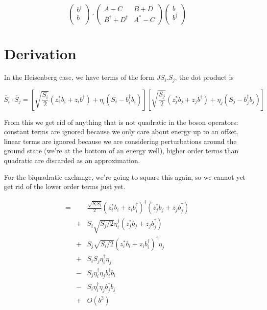 \documentclass{article}
\begin{document}
\begin{equation}
\left(\begin{array}{c}
     b^\dagger \\
     \hline
     b \\
\end{array}
\right) \cdot \left(
\begin{array}{cc}
A - C & B + D \\
B^\dagger + D^\dagger & A^* - C
\end{array}
\right) \left(
\begin{array}{c}
     b \\
     \hline
     b^\dagger \\
\end{array}
\right)
\end{equation}

\section{Derivation}

In the Heisenberg case, we have terms of the form $JS_i.S_j$, the dot product is

\[\bar{S}_i \cdot \bar{S}_j = \left[\sqrt{\frac{S_i}{2}} \left(z_i^* b_i + z_i b^\dagger \right) + \eta_i\left(S_i - b^\dagger_i b_i\right)\right] \left[\sqrt{\frac{S_j}{2}} \left(z_j^* b_j + z_j b^\dagger \right) + \eta_j\left(S_j - b^\dagger_j b_j\right)\right]\]

From this we get rid of anything that is not quadratic in the boson operators: constant terms are ignored because we only care about energy up to an offset, linear terms are ignored because we are considering perturbations around the ground state (we're at the bottom of an energy well), higher order terms than quadratic are discarded as an approximation.

For the biquadratic exchange, we're going to square this again, so we cannot yet get rid of the lower order terms just yet.

\begin{eqnarray}
= & & \frac{\sqrt{S_i S_j}}{2} \left(z_i^* b_i + z_i b_i^\dagger\right)^\dagger \left(z_j^* b_j + z_j b_j^\dagger\right) \\
&+& S_i \sqrt{S_j/2} \eta^\dagger_i \left(z_j^* b_j + z_j b_j^\dagger\right) \\
&+& S_j \sqrt{S_i/2} \left(z_i^* b_i + z_i b_i^\dagger\right)^\dagger \eta_j \\
&+& S_i S_j\eta_i^\dagger \eta_j \\
&-& S_j \eta_i^\dagger \eta_j b^\dagger_i b_i \\
&-& S_i \eta_i^\dagger \eta_j b^\dagger_j b_j \\
&+& O(b^3) \nonumber
\end{eqnarray}
\end{document}
